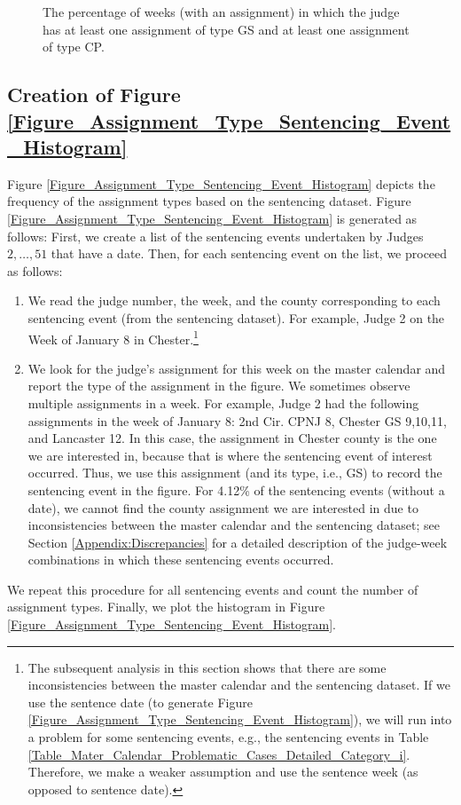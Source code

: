 \documentclass[11pt, oneside]{article}   	%
\theoremstyle{ModifiedStyle}
\begin{document}
\begin{figure}[H]
\begin{minipage}{\textwidth}
				\vspace{-3mm}
				\caption{The percentage of weeks (with an assignment) in which the judge has at least one assignment of type GS and at least one assignment of type CP.}
				\label{Figure_Judge_Schedule_GS_CP_Percentage_Histogram}
			\end{minipage}
		\end{figure}

	\subsection{Creation of Figure \ref{Figure_Assignment_Type_Sentencing_Event_Histogram}}
		Figure \ref{Figure_Assignment_Type_Sentencing_Event_Histogram} depicts the frequency of the assignment types based on the sentencing dataset. Figure \ref{Figure_Assignment_Type_Sentencing_Event_Histogram} is generated as follows: First, we create a list of the sentencing events undertaken by Judges $2,\ldots,51$ that have a date. Then, for each sentencing event on the list, we proceed as follows:
		\begin{enumerate}
			\vspace{-3mm}
			\item We read the judge number, the week, and the county corresponding to each sentencing event (from the sentencing dataset). For example, Judge 2 on the Week of January 8 in Chester.\footnote{The subsequent analysis in this section shows that there are some inconsistencies between the master calendar and the sentencing dataset. If we use the sentence date (to generate Figure \ref{Figure_Assignment_Type_Sentencing_Event_Histogram}), we will run into a problem for some sentencing events, e.g., the sentencing events in Table \ref{Table_Mater_Calendar_Problematic_Cases_Detailed_Category_i}. Therefore, we make a weaker assumption and use the sentence week (as opposed to sentence date).}
			\vspace{-2mm}
			\item We look for the judge's assignment for this week on the master calendar and report the type of the assignment in the figure. We sometimes observe multiple assignments in a week. For example, Judge 2 had the following assignments in the week of January 8: 2nd Cir. CPNJ 8, Chester GS 9,10,11, and Lancaster 12. In this case, the assignment in Chester county is the one we are interested in, because that is where the sentencing event of interest occurred. Thus, we use this assignment (and its type, i.e., GS) to record the sentencing event in the figure. For 4.12\% of the sentencing events (without a date), we cannot find the county assignment we are interested in due to inconsistencies between the master calendar and the sentencing dataset; see Section \ref{Appendix:Discrepancies} for a detailed description of the judge-week combinations in which these sentencing events occurred.
		\end{enumerate}
		\vspace{-3mm}
		We repeat this procedure for all sentencing events and count the number of assignment types. Finally, we plot the histogram in Figure \ref{Figure_Assignment_Type_Sentencing_Event_Histogram}.
\end{document}
